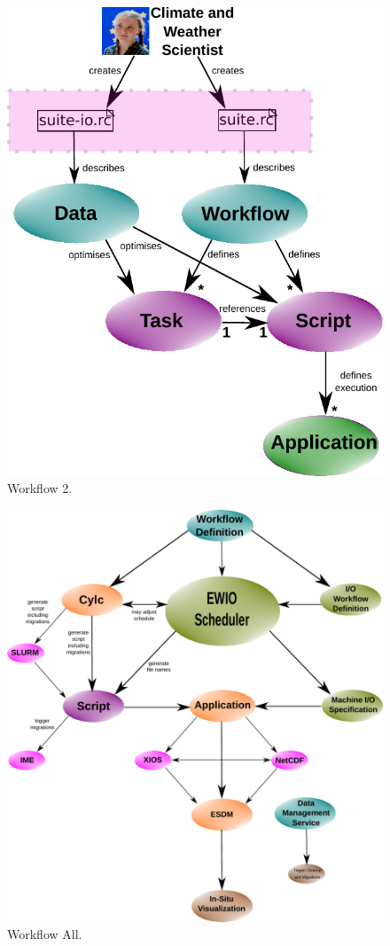 \documentclass[a4paper]{article}
\begin{document}
\begin{figure}[H]
  \centering
  \includegraphics[scale=0.6]{workflow2-v2}
  \caption{Workflow 2.}
  \label{fig:work2}
\end{figure}

\begin{figure}[H]
  \centering
  \includegraphics[scale=0.6]{workflow-all}
  \caption{Workflow All.}
  \label{fig:work2}
\end{figure}
\end{document}
